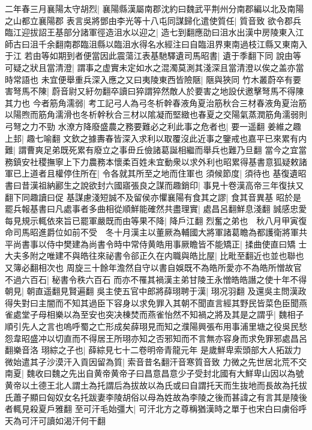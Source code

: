 二年春三月襄陽太守胡烈|{
	襄陽縣漢屬南郡沈約曰魏武平荆州分南郡編以北及南陽之山都立襄陽郡}
表言吳將鄧由李光等十八屯同謀歸化遣使質任|{
	質音致}
欲令郡兵臨江迎拔詔王基部分諸軍徑造沮水以迎之|{
	造七到翻應劭曰沮水出漢中房陵東入江師古曰沮千余翻南郡臨沮縣以臨沮水得名水經注曰自臨沮界東南過枝江縣又東南入于江}
若由等如期到者便當因此震蕩江表基馳驛遺司馬昭書|{
	遺于季翻下同}
說由等可疑之狀且當清澄|{
	謂事之虚實未定如水之混濁莫測其淺深且當清澄以俟之盖亦當時常語也}
未宜便舉重兵深入應之又曰夷陵東西皆險陿|{
	陿與狹同}
竹木叢蔚卒有要害弩馬不陳|{
	蔚音尉又紆勿翻卒讀曰猝謂猝然敵人於要害之地設伏邀擊弩馬不得陳其力也}
今者筋角濡弱|{
	考工記弓人為弓冬析幹春液角夏治筋秋合三材春液角夏治筋以陽煦而筋角濡滑也冬析幹秋合三材以隂凝而堅緻也春夏之交陽氣蒸潤筋角濡弱則弓弩之力不勁}
水潦方降廢盛農之務要難必之利此事之危者也|{
	要一遥翻}
姜維之趣上邽|{
	趣七喻翻}
文欽之據夀春皆深入求利以取覆沒此近事之鑒戒也嘉平已來累有内難|{
	謂曹爽足弟既死累有廢立之事毌丘儉諸葛誕相繼而舉兵也難乃旦翻}
當今之宜當務鎮安社稷撫寧上下力農務本懷柔百姓未宜動衆以求外利也昭累得基書意狐疑敕諸軍已上道者且權停住所在|{
	令各就其所至之地而住軍也}
須候節度|{
	須待也}
基復遺昭書曰昔漢祖納酈生之說欲封六國寤張良之謀而趣銷印|{
	事見十卷漢高帝三年復扶又翻下同趣讀曰促}
基謀慮淺短誠不及留侯亦懼襄陽有食其之謬|{
	食其音異基}
昭於是罷兵報基書曰凡處事者多曲相從順鮮能確然共盡理實|{
	處昌呂翻鮮息淺翻}
誠感忠愛每見規示輒依來旨已罷軍嚴既而由等果不降|{
	降戶江翻}
烈奮之弟也　秋八月甲寅復命司馬昭進爵位如前不受　冬十月漢主以董厥為輔國大將軍諸葛瞻為都護衛將軍共平尚書事以侍中樊建為尚書令時中常侍黄皓用事厥瞻皆不能矯正|{
	揉曲使直曰矯}
士大夫多附之唯建不與皓往來祕書令郤正久在内職與皓比屋|{
	比毗至翻近也並也聯也又簿必翻相次也}
周旋三十餘年澹然自守以書自娛既不為皓所愛亦不為皓所憎故官不過六百石|{
	秘書令秩六百石}
而亦不罹其禍漢主弟甘陵王永憎皓皓譖之使十年不得朝見|{
	朝直遥翻見賢遍翻}
吳主使五官中郎將薛珝聘于漢|{
	珝况羽翻}
及還吳主問漢政得失對曰主闇而不知其過臣下容身以求免罪入其朝不聞直言經其野民皆菜色臣聞燕雀處堂子母相樂以為至安也突决棟焚而燕雀怡然不知禍之將及其是之謂乎|{
	魏相子順引先人之言也嗚呼蜀之亡形成矣薛珝見而知之濮陽興張布用事浦里塘之役吳民愁怨韋昭盛冲以切直而不得居王所珝亦知之否邪知而不言無亦容身而求免罪邪處昌呂翻樂音洛}
珝綜之子也|{
	薛綜見七十二卷明帝青龍元年}
是歲鮮卑索頭部大人拓跋力微始遣其子沙漠汗入貢因留為質|{
	索音昔名翻汗音寒質音致}
力微之先世居北荒不交南夏|{
	魏收曰魏之先出自黄帝黄帝子曰昌意昌意少子受封北國有大鮮卑山因以為號黄帝以土德王北人謂土為托謂后為拔故以為氏或曰自謂托天而生抜地而長故為托拔氏蕭子顯曰匈奴女名托跋妻李陵胡俗以母為姓故為李陵之後而甚諱之有言其是陵後者輒見殺夏戶雅翻}
至可汗毛始彊大|{
	可汗北方之尊稱猶漢時之單于也宋白曰虜俗呼天為可汗可讀如渴汗何干翻}
